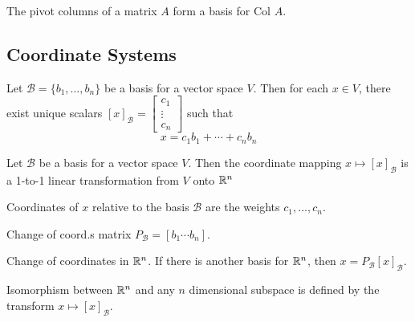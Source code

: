 \begin{card}
\begin{compactdesc}
    \end{compactdesc}
    \begin{theorem}\label{th-pivot-basis}
    The pivot columns of a matrix $A$ form a basis for Col $A$.
    \end{theorem}
\end{card}



\begin{card}
    \subsection{Coordinate Systems}

    \begin{theorem}
    Let $\mathcal{B} = \{b_1, \dotsc, b_n\}$ be a basis for a vector space
    $V$. Then for each $x \in V$, there exist unique scalars
    $[x]_\mathcal{B} = \begin{bmatrix} c_1 \\ \vdots \\ c_n \end{bmatrix}$
    such that
    $$
        x = c_1b_1 + \dotsb + c_n b_n
    $$
    \end{theorem}
    \begin{theorem}
    Let $\mathcal{B}$ be a basis for a vector space $V$.
    Then the coordinate mapping $x \mapsto [x]_\mathcal{B}$ is a
    1-to-1 linear transformation from $V$ onto $\mathbb{R}^n$
    \end{theorem}

    \begin{compactdesc}
    \item[Coordinates] of $x$ relative to the basis $\mathcal{B}$ are the
        weights $c_1, \dotsc, c_n$.
    \item[Change of coord.s matrix] $P_\mathcal{B} = [b_1 \cdots b_n]$.
    \item[Change of coordinates] in $\mathbb{R}^n$. If there is another basis for
        $\mathbb{R}^n$, then $x = P_\mathcal{B}[x]_\mathcal{B}$.
    \item[Isomorphism] between $\mathbb{R}^n$ and any $n$ dimensional subspace is
        defined by the transform $x \mapsto [x]_\mathcal{B}$.
    \end{compactdesc}
\end{card}



